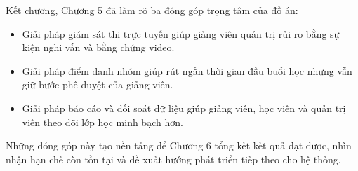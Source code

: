 \documentclass[../DoAn.tex]{subfiles}
\begin{document}
Kết chương, Chương 5 đã làm rõ ba đóng góp trọng tâm của đồ án:
\begin{itemize}
    \item Giải pháp giám sát thi trực tuyến giúp giảng viên quản trị rủi ro bằng sự kiện nghi vấn và bằng chứng video.
    \item Giải pháp điểm danh nhóm giúp rút ngắn thời gian đầu buổi học nhưng vẫn giữ bước phê duyệt của giảng viên.
    \item Giải pháp báo cáo và đối soát dữ liệu giúp giảng viên, học viên và quản trị viên theo dõi lớp học minh bạch hơn.
\end{itemize}

Những đóng góp này tạo nền tảng để Chương 6 tổng kết kết quả đạt được, nhìn nhận hạn chế còn tồn tại và đề xuất hướng phát triển tiếp theo cho hệ thống.
\end{document}
